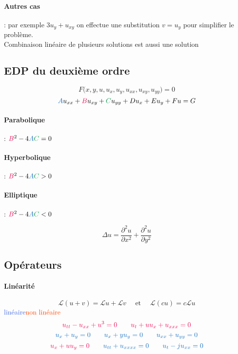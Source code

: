 \documentclass[resume]{subfiles}
\begin{document}
\paragraph{Autres cas} : par exemple $3u_y+u_{xy}$ on effectue une substitution $v=u_y$ pour simplifier le problème.\\
Combinaison linéaire de plusieurs solutions est aussi une solution
\subsection{EDP du deuxième ordre}
$$F\Big(x,y,u,u_x,u_y,u_{xx},u_{xy},u_{yy}\Big)=0$$
$$\textcolor{RoyalBlue}{A}u_{xx}+\textcolor{OrangeRed}{B}u_{xy}+\textcolor{ForestGreen}{C}u_{yy}+Du_x+Eu_y+Fu=G$$
\paragraph{Parabolique} : $\textcolor{OrangeRed}{B}^2-4\textcolor{RoyalBlue}{A}\textcolor{ForestGreen}{C}=0$
\paragraph{Hyperbolique} : $\textcolor{OrangeRed}{B}^2-4\textcolor{RoyalBlue}{A}\textcolor{ForestGreen}{C}>0$
\paragraph{Elliptique} : $\textcolor{OrangeRed}{B}^2-4\textcolor{RoyalBlue}{A}\textcolor{ForestGreen}{C}<0$

$$\Delta u = \frac{\partial^2 u}{\partial x^2}+\frac{\partial^2 u}{\partial y^2}$$

\subsection{Opérateurs}
\paragraph{Linéarité}
$$\mathcal{L}(u+v)=\mathcal{L}u+\mathcal{L}v\quad \text{ et }\quad \mathcal{L}(cu)=c\mathcal{L}u$$
\hfill \textcolor{RoyalBlue}{linéaire}\hfill \textcolor{OrangeRed}{non linéaire}\hfill \
$$\textcolor{OrangeRed}{u_{tt}-u_{xx}+u^3=0}\qquad \textcolor{OrangeRed}{u_t+uu_x+u_{xxx}=0}$$
$$\textcolor{RoyalBlue}{u_x+u_y=0}\qquad \textcolor{RoyalBlue}{u_x+yu_y=0}\qquad\textcolor{RoyalBlue}{u_{xx}+u_{yy}=0}$$
$$\textcolor{OrangeRed}{u_x+uu_y=0}\qquad \textcolor{RoyalBlue}{u_{tt}+u_{xxxx}=0}\qquad \textcolor{RoyalBlue}{u_t-ju_{xx}=0}$$
\end{document}
